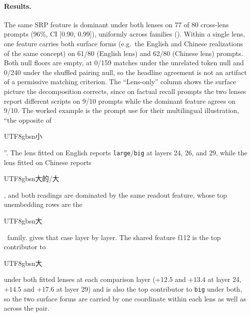 \paragraph{Results.}
The same SRP feature is dominant under both lenses on 77 of 80
cross-lens prompts (96\%, CI [0.90, 0.99]), uniformly across families
(). Within a single lens, one feature
carries both surface forms (e.g.\ the English and Chinese realizations
of the same concept) on 61/80 (English lens) and 62/80 (Chinese lens)
prompts. Both null floors are empty, at 0/159 matches under the unrelated
token null and 0/240 under the shuffled pairing null, so the headline agreement is
not an artifact of a permissive matching criterion. The ``Lens-only''
column shows the surface picture the decomposition corrects, since on
factual recall prompts the two lenses report different scripts on 9/10
prompts while the dominant feature agrees on 9/10. The worked example is
the prompt \citet{gurnee2026workspace} use for their multilingual
illustration, ``the opposite of
\begin{CJK*}{UTF8}{gbsn}小\end{CJK*}''. The lens fitted on English reports
\texttt{large}/\texttt{big} at layers 24, 26, and 29, while the lens
fitted on Chinese reports
\begin{CJK*}{UTF8}{gbsn}大的/大\end{CJK*}, and both readings are dominated
by the same readout feature, whose top unembedding rows are the
\begin{CJK*}{UTF8}{gbsn}大\end{CJK*}~family.
 gives that case layer by layer.
The shared feature f112 is the
top contributor to \begin{CJK*}{UTF8}{gbsn}大\end{CJK*} under both
fitted lenses at each comparison layer (\(+12.5\) and \(+13.4\) at layer
24, \(+14.5\) and \(+17.6\) at layer 29) and is also the top
contributor to \texttt{big} under both, so the two surface forms are
carried by one coordinate within each lens as well as across the pair.


